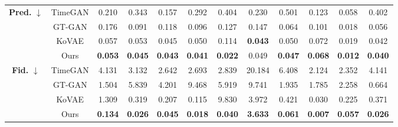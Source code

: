 \documentclass{article}
\theoremstyle{plain}
\theoremstyle{definition}
\theoremstyle{remark}
\begin{document}
{\begin{table*}[!t]
{\begin{tabular}{cc|cccccccccc}
    \multirow{4}{*}{\textbf{Pred.} $\downarrow$} 
      & TimeGAN 
         & 0.210 
         & 0.343 
         & 0.157 
         & 0.292 
         & 0.404 
         & 0.230 
         & 0.501 
         & 0.123 
         & 0.058 
         & 0.402 \\
      & GT-GAN  
         & 0.176 
         & 0.091 
         & 0.118 
         & 0.096 
         & 0.127 
         & 0.147 
         & 0.064 
         & 0.101 
         & 0.018 
         & 0.056 \\
      & KoVAE   
         & 0.057 
         & 0.053 
         & 0.045 
         & 0.050 
         & 0.114 
         & \cellcolor{blue!10}\textbf{0.043}
         & 0.050 
         & 0.072 
         & 0.019 
         & 0.042 \\
      & Ours    
         & \cellcolor{blue!10}\textbf{0.053}
         & \cellcolor{blue!10}\textbf{0.045}
         & \cellcolor{blue!10}\textbf{0.043}
         & \cellcolor{blue!10}\textbf{0.041}
         & \cellcolor{blue!10}\textbf{0.022}
         & 0.049
         & \cellcolor{blue!10}\textbf{0.047}
         & \cellcolor{blue!10}\textbf{0.068}
         & \cellcolor{blue!10}\textbf{0.012}
         & \cellcolor{blue!10}\textbf{0.040} \\
    \midrule
    
    \multirow{4}{*}{\textbf{Fid.} $\downarrow$} 
      & TimeGAN 
         & 4.131 
         & 3.132 
         & 2.642 
         & 2.693 
         & 2.839 
         & 20.184 
         & 6.408 
         & 2.124 
         & 2.352 
         & 4.141 \\
      & GT-GAN  
         & 1.504 
         & 5.839 
         & 4.201 
         & 9.468 
         & 5.919 
         & 9.741 
         & 1.935 
         & 1.785 
         & 2.258 
         & 0.664 \\
      & KoVAE   
         & 1.309 
         & 0.319 
         & 0.207 
         & 0.115 
         & 9.830 
         & 3.972
         & 0.421 
         & 0.030 
         & 0.225 
         & 0.371 \\
      & Ours    
         & \cellcolor{blue!10}\textbf{0.134}
         & \cellcolor{blue!10}\textbf{0.026}
         & \cellcolor{blue!10}\textbf{0.045}
         & \cellcolor{blue!10}\textbf{0.018}
         & \cellcolor{blue!10}\textbf{0.040}
         & \cellcolor{blue!10}\textbf{3.633}
         & \cellcolor{blue!10}\textbf{0.061}
         & \cellcolor{blue!10}\textbf{0.007}
         & \cellcolor{blue!10}\textbf{0.057}
         & \cellcolor{blue!10}\textbf{0.026} \\
    \midrule


\end{tabular}}
\end{table*}}
\end{document}
